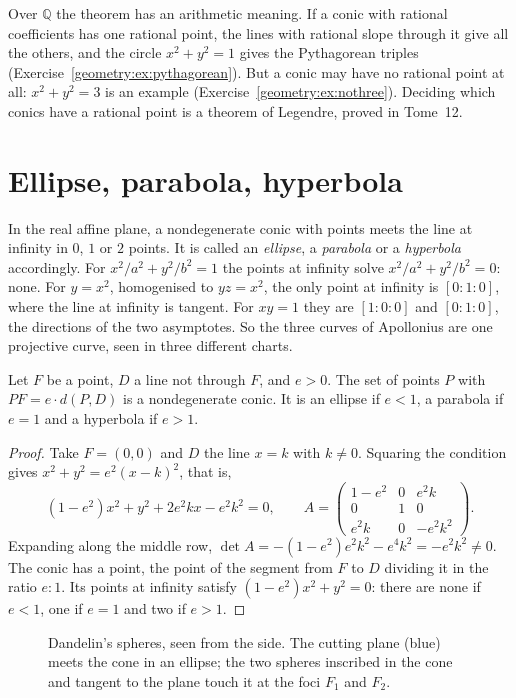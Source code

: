 Over $\mathbb Q$ the theorem has an arithmetic meaning. If a conic with rational coefficients has one rational point, the lines with rational slope
through it give all the others, and the circle $x^2+y^2=1$ gives the Pythagorean triples (Exercise~\ref{geometry:ex:pythagorean}). But a conic may have no
rational point at all: $x^2+y^2=3$ is an example (Exercise~\ref{geometry:ex:nothree}). Deciding which conics have a rational point is a theorem of Legendre,
proved in Tome~12.

\section{Ellipse, parabola, hyperbola}

In the real affine plane, a nondegenerate conic with points meets the line at infinity in $0$, $1$ or $2$ points. It is called an \emph{ellipse}, a
\emph{parabola} or a \emph{hyperbola} accordingly. For $x^2/a^2+y^2/b^2=1$ the points at infinity solve $x^2/a^2+y^2/b^2=0$: none. For $y=x^2$,
homogenised to $yz=x^2$, the only point at infinity is $[0:1:0]$, where the line at infinity is tangent. For $xy=1$ they are $[1:0:0]$ and $[0:1:0]$,
the directions of the two asymptotes. So the three curves of Apollonius are one projective curve, seen in three different charts.

\begin{proposition}\label{geometry:prop:focus}
Let $F$ be a point, $D$ a line not through $F$, and $e>0$. The set of points $P$ with $PF=e\cdot d(P,D)$ is a nondegenerate conic. It is an ellipse
if $e<1$, a parabola if $e=1$ and a hyperbola if $e>1$.
\end{proposition}

\begin{proof}
Take $F=(0,0)$ and $D$ the line $x=k$ with $k\ne0$. Squaring the condition gives $x^2+y^2=e^2(x-k)^2$, that is,
\[
(1-e^2)x^2+y^2+2e^2kx-e^2k^2=0,\qquad
A=\begin{pmatrix}1-e^2&0&e^2k\\0&1&0\\e^2k&0&-e^2k^2\end{pmatrix}.
\]
Expanding along the middle row, $\det A=-(1-e^2)e^2k^2-e^4k^2=-e^2k^2\ne0$. The conic has a point, the point of the segment from $F$ to $D$ dividing it
in the ratio $e:1$. Its points at infinity satisfy $(1-e^2)x^2+y^2=0$: there are none if $e<1$, one if $e=1$ and two if $e>1$.
\end{proof}

\begin{figure}[ht]
\centering
{}
\caption{Dandelin's spheres, seen from the side. The cutting plane (blue) meets the cone in an ellipse; the two spheres inscribed in the cone and
tangent to the plane touch it at the foci $F_1$ and $F_2$.}
\label{geometry:fig:dandelin}
\end{figure}

